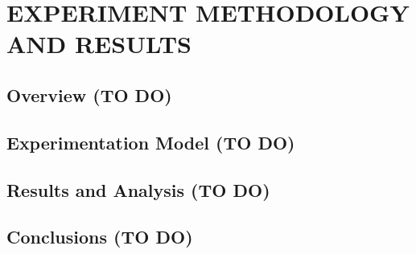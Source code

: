 \chapter{EXPERIMENT METHODOLOGY AND RESULTS}



\section{Overview (TO DO)}


\section{Experimentation Model (TO DO)}
\label{sec:experiment-methodology}


\section{Results and Analysis (TO DO)}


\section{Conclusions (TO DO)}



